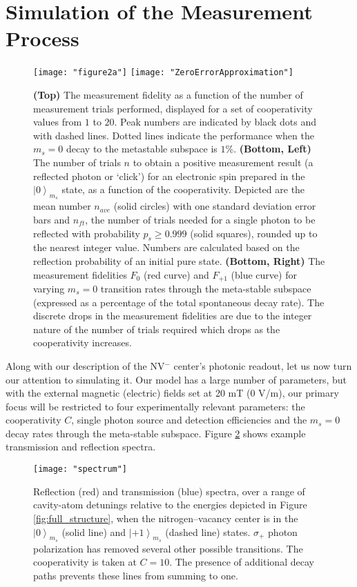 \documentclass[aps,pra,amsmath,amssymb,reprint,superscriptaddress,tightenlines]{revtex4-1}
\begin{document}
\section{Simulation of the Measurement Process} 
\label{sec:analysis}


\begin{figure}[hbt]
\texttt{[image: "figure2a"]}
\texttt{[image: "ZeroErrorApproximation"]}
\caption{
{\bf (Top)} The measurement fidelity as a function of the number of measurement trials performed, displayed for a set of cooperativity values from $1$ to $20$. Peak numbers are indicated by black dots and with dashed lines. Dotted lines indicate the performance when the $m_{s}=0$ decay to the metastable subspace is $1$\%.
{\bf (Bottom, Left)} The number of trials $n$ to obtain a positive measurement result (a reflected photon or `click') for an electronic spin prepared in the $\left| 0 \right>_{m_{s}}$ state, as a function of the cooperativity. Depicted are the mean number $n_{ave}$ (solid circles) with one standard deviation error bars and $n_{ft}$, the number of trials needed for a single photon to be reflected with probability $p_{s} \geq 0.999$ (solid squares), rounded up to the nearest integer value. Numbers are calculated based on the reflection probability of an initial pure state.
{\bf (Bottom, Right)} The measurement fidelities $F_{0}$ (red curve) and $F_{+1}$ (blue curve) for varying $m_{s}=0$ transition rates through the meta-stable subspace (expressed as a percentage of the total spontaneous decay rate).
 The discrete drops in the measurement fidelities are due to the integer nature of the number of trials required which drops as the cooperativity increases.}
\label{fig:ideal_fidelity} 
\end{figure}


Along with our description of the NV$^-$ center's photonic readout, let us now turn our attention to simulating it. Our model has a large number of parameters, but with the external magnetic (electric) fields set at 20 mT (0 V/m), our primary focus will be restricted to four experimentally relevant parameters: the cooperativity $C$, single photon source and detection efficiencies and the $m_{s}=0$ decay rates through the meta-stable subspace. Figure \ref{fig_spectra} shows example transmission and reflection spectra.

\begin{figure}[htb]
\texttt{[image: "spectrum"]}
\caption{Reflection (red) and transmission (blue) spectra, over a range of cavity-atom detunings relative to the energies depicted in Figure \ref{fig:full_structure}, when the nitrogen--vacancy center is in the $\left| 0 \right>_{m_{s}}$ (solid line) and $\left| +1 \right>_{m_{s}}$ (dashed line) states. $\sigma_{+}$ photon polarization has removed several other possible transitions. The cooperativity is taken at $C=10$. The presence of additional decay paths prevents these lines from summing to one.}
\label{fig_spectra} 
\end{figure}
\end{document}
